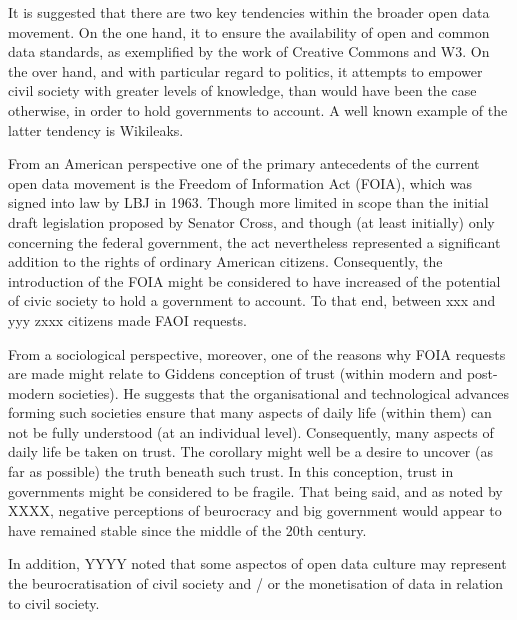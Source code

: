 It is suggested that there are two key tendencies within the broader open data movement.
On the one hand, it to ensure the availability of open and common data standards, as exemplified by the work of Creative Commons and W3.
On the over hand, and with particular regard to politics, it attempts to empower civil society with greater levels of knowledge, than would have been the case otherwise, in order to hold governments to account.
A well known example of the latter tendency is Wikileaks.  

From an American perspective one of the primary antecedents of the current open data movement is the Freedom of Information Act (FOIA), which was signed into law by LBJ in 1963.
Though more limited in scope than the initial draft legislation proposed by Senator Cross, and though (at least initially) only concerning the federal government, the act nevertheless represented a significant addition to the rights of ordinary American citizens.
Consequently, the introduction of the FOIA might be considered to have increased of the potential of civic society to hold a government to account.
To that end, between xxx and yyy zxxx citizens made FAOI requests.

From a sociological perspective, moreover, one of the reasons why FOIA requests are made might relate to Giddens conception of trust (within modern and post-modern societies).
He suggests that the organisational and technological advances forming such societies ensure that many aspects of daily life (within them) can not be fully understood (at an individual level).
Consequently, many aspects of daily life be taken on trust.
The corollary might well be a desire to uncover (as far as possible) the truth beneath such trust.
In this conception, trust in governments might be considered to be fragile.
That being said, and as noted by XXXX, negative perceptions of beurocracy and big government would appear to have remained stable since the middle of the 20th century. 

In addition, YYYY noted that some aspectos of open data culture may represent the beurocratisation of civil society and / or the monetisation of data in relation to civil society.
